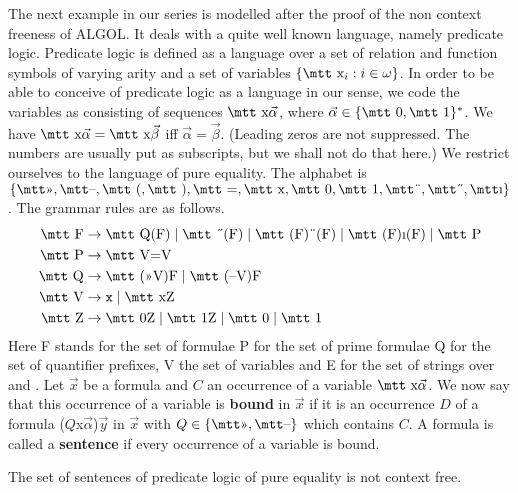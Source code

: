 The next example in our series is modelled after the proof of
the non context freeness of ALGOL. 
It deals with a quite
well known language, namely predicate logic. Predicate logic is
defined as a language over a set of relation and function
symbols of varying arity and a set of variables $\{\mbox{\mtt x}_i 
: i \in \omega\}$. In order to be able to conceive of predicate logic 
as a language in our sense, we code the variables as consisting
of sequences $\mbox{\mtt x}\vec{\alpha}$, where $\vec{\alpha} \in 
\{\mbox{\mtt 0}, \mbox{\mtt 1}\}^{\ast}$.
We have $\mbox{\mtt x}\vec{\alpha} = \mbox{\mtt x}\vec{\beta}$
iff $\vec{\alpha} = \vec{\beta}$. (Leading zeros
are not suppressed. The numbers are usually put as subscripts, but 
we shall not do that here.) We restrict ourselves to the language of
pure equality. The alphabet is $\{\mbox{\mtt\symbol{20}}, 
\mbox{\mtt\symbol{21}}, \mbox{\mtt (}, \mbox{\mtt )}, \mbox{\mtt =}, 
\mbox{\mtt x}, \mbox{\mtt 0}, \mbox{\mtt 1}, \mbox{\mtt\symbol{4}}, 
\mbox{\mtt\symbol{5}}, \mbox{\mtt\symbol{25}}\}$. 
The grammar rules are as follows.
\begin{align}
\mbox{\mtt F} & \pf\mbox{\mtt Q(F)} \mid \mbox{\mtt \symbol{5}(F)} \mid
    \mbox{\mtt (F)\symbol{4}(F)} \mid
    \mbox{\mtt (F)\symbol{25}(F)} \mid 
    \mbox{\mtt P} \\\notag
\mbox{\mtt P} & \pf\mbox{\mtt V=V} \\\notag
\mbox{\mtt Q} & \pf\mbox{\mtt (\symbol{20}V)F} 
	\mid \mbox{\mtt (\symbol{21}V)F} \\\notag
\mbox{\mtt V} & \pf \mbox{\tt x} \mid \mbox{\mtt xZ} \\\notag
\mbox{\mtt Z} & \pf\mbox{\mtt 0Z} \mid \mbox{\mtt 1Z} \mid \mbox{\mtt 0}
    \mid \mbox{\mtt 1}
\end{align}
Here {\mtt F} stands for the set of formulae {\mtt P} for the set of
prime formulae {\mtt Q} for the set of quantifier prefixes,
{\mtt V} the set of variables and {\mtt E} for the set of strings
over {} and {}. Let $\vec{x}$ be a formula and $C$ an
occurrence of a variable $\mbox{\mtt x}\vec{\alpha}$. We now
say that this occurrence
of a variable is \textbf{bound} in $\vec{x}$ if it is an occurrence
$D$ of a formula {\mtt ($Q$x$\vec{\alpha}$)$\vec{y}$} in $\vec{x}$
with $Q \in \{\mbox{\mtt\symbol{20}}, \mbox{\mtt\symbol{21}}\}$ 
which contains $C$. A formula is called a 
\textbf{sentence} if every occurrence of a variable is bound.
\begin{thm}
The set of sentences of predicate logic of pure equality is not
context free.
\end{thm}
